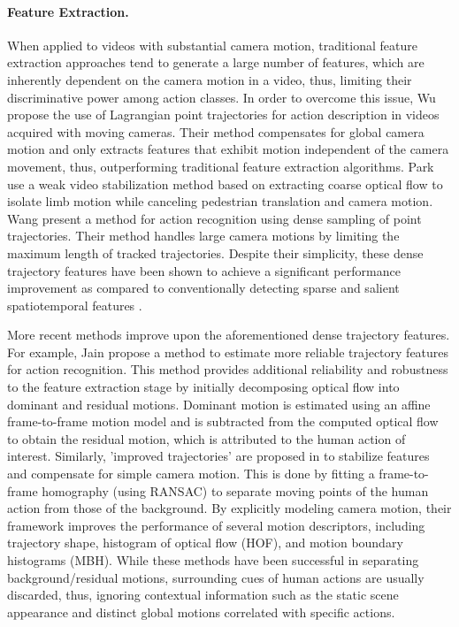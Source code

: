 \paragraph{\textbf{Feature Extraction.}} When applied to videos with substantial camera motion, traditional feature extraction approaches \cite{dollar2005, laptev2005} tend to generate a large number of features, which are inherently dependent on the camera motion in a video, thus, limiting their discriminative power among action classes. In order to overcome this issue, Wu \etal \cite{wu2011} propose the use of Lagrangian point trajectories for action description in videos acquired with moving cameras. Their method compensates for global camera motion and only extracts features that exhibit motion independent of the camera movement, thus, outperforming traditional feature extraction algorithms. Park \etal \cite{park2013} use a weak video stabilization method based on extracting coarse optical flow to isolate limb motion while canceling pedestrian translation and camera motion. Wang \etal \cite{wang2011} present a method for action recognition using dense sampling of point trajectories. Their method handles large camera motions by limiting the maximum length of tracked trajectories. Despite their simplicity, these dense trajectory features have been shown to achieve a significant performance improvement as compared to conventionally detecting sparse and salient spatiotemporal features \cite{laptev2005}.

More recent methods improve upon the aforementioned dense trajectory features. For example, Jain \etal \cite{jain2013} propose a method to estimate more reliable trajectory features for action recognition. This method provides additional reliability and robustness to the feature extraction stage by initially decomposing optical flow into dominant and residual motions. Dominant motion is estimated using an affine frame-to-frame motion model and is subtracted from the computed optical flow to obtain the residual motion, which is attributed to the human action of interest. Similarly, 'improved trajectories' are proposed in \cite{wang2013} to stabilize features and compensate for simple camera motion. This is done by fitting a frame-to-frame homography (using RANSAC) to separate moving points of the human action from those of the background. By explicitly modeling camera motion, their framework improves the performance of several motion descriptors, including trajectory shape, histogram of optical flow (HOF), and motion boundary histograms (MBH). While these methods have been successful in separating background/residual motions, surrounding cues of human actions are usually discarded, thus, ignoring contextual information such as the static scene appearance and distinct global motions correlated with specific actions.

